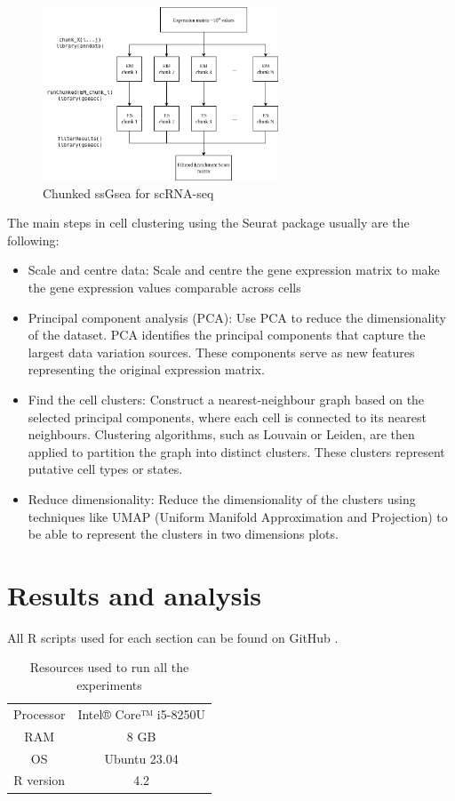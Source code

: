 \documentclass[aps,prb,twocolumn,superscriptaddress,floatfix,longbibliography]{revtex4-2}
\newif\ifptitle
\newif\ifpnumber
\newcounter{para}
\newcommand\ptitle[1]{\par\refstepcounter{para}
{\ifpnumber{\noindent\textcolor{lightgray}{\textbf{\thepara}}\indent}\fi}
{\ifptitle{\textbf{[{#1}]}}\fi}}
\begin{document}
\begin{figure}[h]
\centering
\includegraphics[clip=true,width=7cm]{img/gsea-pipeline.png}
\caption{Chunked ssGsea for scRNA-seq}
\label{fig:chunkedgsea}
\end{figure}


\ptitle{Seurat \cite{seurat-v4} \cite{seurat-web}} The main steps in cell clustering using the Seurat package usually are the following:
\begin{itemize}
\item Scale and centre data: Scale and centre the gene expression matrix to make the gene expression values comparable across cells
\item Principal component analysis (PCA): Use PCA to reduce the dimensionality of the dataset. PCA identifies the principal components that capture the largest data variation sources. These components serve as new features representing the original expression matrix.
\item Find the cell clusters: Construct a nearest-neighbour graph based on the selected principal components, where each cell is connected to its nearest neighbours. Clustering algorithms, such as Louvain or Leiden, are then applied to partition the graph into distinct clusters. These clusters represent putative cell types or states.
\item Reduce dimensionality: Reduce the dimensionality of the clusters using techniques like UMAP (Uniform Manifold Approximation and Projection) to be able to represent the clusters in two dimensions plots.
\end{itemize}

\section{\label{sec:Results}Results and analysis}

All R scripts used for each section can be found on GitHub \cite{thesis-github}.

\begin{table}[H]
\centering
\caption{Resources used to run all the experiments}
\begin{tabular}{ | c | c | }
    \hline
    Processor & Intel® Core™ i5-8250U  \\
    RAM & 8 GB \\
    OS & Ubuntu 23.04 \\
    R version & 4.2 \\
    \hline
\end{tabular}
\end{table}
\end{document}
